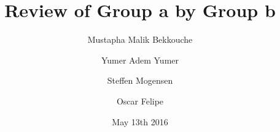 \documentclass{article}
\title{\huge\sffamily\bfseries Review of Group a by Group b}
\author{ Mustapha Malik Bekkouche \and Yumer Adem Yumer \and Steffen Mogensen \and Oscar Felipe}
\date{May 13th 2016}
\begin{document}
\maketitle


\tableofcontents
\pagebreak









\end{document}
